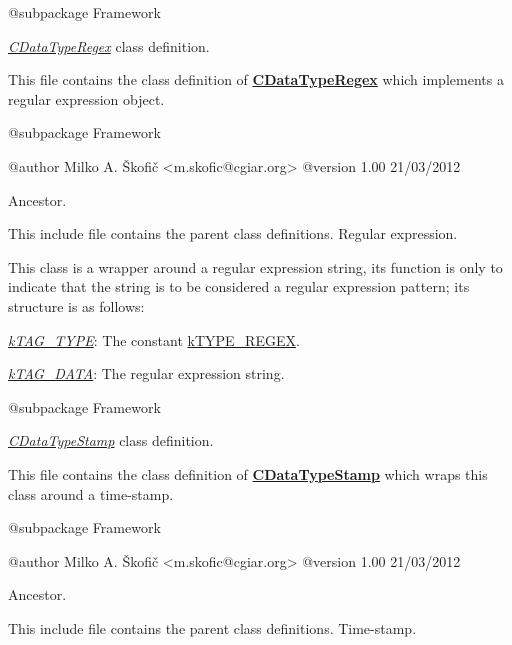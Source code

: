 \begin{DoxyVerb}    @subpackage     Framework\end{DoxyVerb}


{\itshape \hyperlink{class_c_data_type_regex}{C\-Data\-Type\-Regex}} class definition.

This file contains the class definition of {\bfseries \hyperlink{class_c_data_type_regex}{C\-Data\-Type\-Regex}} which implements a regular expression object.

\begin{DoxyVerb}    @subpackage     Framework

    @author         Milko A. Škofič <m.skofic@cgiar.org>
    @version        1.00 21/03/2012\end{DoxyVerb}


Ancestor.

This include file contains the parent class definitions. Regular expression.

This class is a wrapper around a regular expression string, its function is only to indicate that the string is to be considered a regular expression pattern; its structure is as follows\-:


\begin{DoxyItemize}
\item {\itshape \hyperlink{}{k\-T\-A\-G\-\_\-\-T\-Y\-P\-E}}\-: The constant \hyperlink{}{k\-T\-Y\-P\-E\-\_\-\-R\-E\-G\-E\-X}. 
\item {\itshape \hyperlink{}{k\-T\-A\-G\-\_\-\-D\-A\-T\-A}}\-: The regular expression string. 
\end{DoxyItemize}

\begin{DoxyVerb}    @subpackage     Framework\end{DoxyVerb}


{\itshape \hyperlink{class_c_data_type_stamp}{C\-Data\-Type\-Stamp}} class definition.

This file contains the class definition of {\bfseries \hyperlink{class_c_data_type_stamp}{C\-Data\-Type\-Stamp}} which wraps this class around a time-\/stamp.

\begin{DoxyVerb}    @subpackage     Framework

    @author         Milko A. Škofič <m.skofic@cgiar.org>
    @version        1.00 21/03/2012\end{DoxyVerb}


Ancestor.

This include file contains the parent class definitions. Time-\/stamp.

